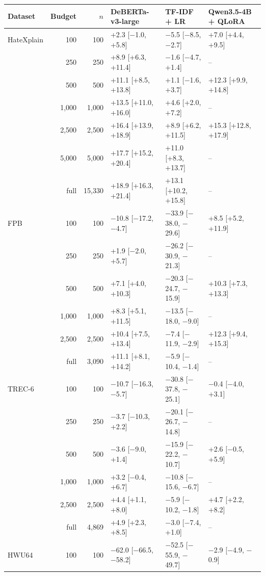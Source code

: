 \begin{tabular}{lrrlll}
\toprule
Dataset & Budget & $n$ & DeBERTa-v3-large & TF-IDF + LR & Qwen3.5-4B + QLoRA \\
\midrule
HateXplain & 100 & 100 & +2.3 [$-$1.0, +5.8] & $-$5.5 [$-$8.5, $-$2.7] & +7.0 [+4.4, +9.5] \\
 & 250 & 250 & +8.9 [+6.3, +11.4] & $-$1.6 [$-$4.7, +1.4] & -- \\
 & 500 & 500 & +11.1 [+8.5, +13.8] & +1.1 [$-$1.6, +3.7] & +12.3 [+9.9, +14.8] \\
 & 1{,}000 & 1{,}000 & +13.5 [+11.0, +16.0] & +4.6 [+2.0, +7.2] & -- \\
 & 2{,}500 & 2{,}500 & +16.4 [+13.9, +18.9] & +8.9 [+6.2, +11.5] & +15.3 [+12.8, +17.9] \\
 & 5{,}000 & 5{,}000 & +17.7 [+15.2, +20.4] & +11.0 [+8.3, +13.7] & -- \\
 & full & 15{,}330 & +18.9 [+16.3, +21.4] & +13.1 [+10.2, +15.8] & -- \\
\midrule
FPB & 100 & 100 & $-$10.8 [$-$17.2, $-$4.7] & $-$33.9 [$-$38.0, $-$29.6] & +8.5 [+5.2, +11.9] \\
 & 250 & 250 & +1.9 [$-$2.0, +5.7] & $-$26.2 [$-$30.9, $-$21.3] & -- \\
 & 500 & 500 & +7.1 [+4.0, +10.3] & $-$20.3 [$-$24.7, $-$15.9] & +10.3 [+7.3, +13.3] \\
 & 1{,}000 & 1{,}000 & +8.3 [+5.1, +11.5] & $-$13.5 [$-$18.0, $-$9.0] & -- \\
 & 2{,}500 & 2{,}500 & +10.4 [+7.5, +13.4] & $-$7.4 [$-$11.9, $-$2.9] & +12.3 [+9.4, +15.3] \\
 & full & 3{,}090 & +11.1 [+8.1, +14.2] & $-$5.9 [$-$10.4, $-$1.4] & -- \\
\midrule
TREC-6 & 100 & 100 & $-$10.7 [$-$16.3, $-$5.7] & $-$30.8 [$-$37.8, $-$25.1] & $-$0.4 [$-$4.0, +3.1] \\
 & 250 & 250 & $-$3.7 [$-$10.3, +2.2] & $-$20.1 [$-$26.7, $-$14.8] & -- \\
 & 500 & 500 & $-$3.6 [$-$9.0, +1.4] & $-$15.9 [$-$22.2, $-$10.7] & +2.6 [$-$0.5, +5.9] \\
 & 1{,}000 & 1{,}000 & +3.2 [$-$0.4, +6.7] & $-$10.8 [$-$15.6, $-$6.7] & -- \\
 & 2{,}500 & 2{,}500 & +4.4 [+1.1, +8.0] & $-$5.9 [$-$10.2, $-$1.8] & +4.7 [+2.2, +8.2] \\
 & full & 4{,}869 & +4.9 [+2.3, +8.5] & $-$3.0 [$-$7.4, +1.0] & -- \\
\midrule
HWU64 & 100 & 100 & $-$62.0 [$-$66.5, $-$58.2] & $-$52.5 [$-$55.9, $-$49.7] & $-$2.9 [$-$4.9, $-$0.9] \\

\end{tabular}
